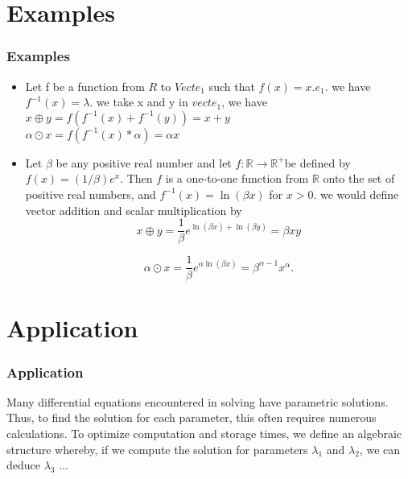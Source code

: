 \documentclass[11pt]{beamer}
\begin{document}

\section{Examples}
\begin{frame}
    \frametitle{Examples}
    \begin{itemize}
        \item Let f be a function from $R$ to $Vect{e_1}$ such that $f(x) = x.e_1$.
        we have $f^{-1}(x) = \lambda$.
            we take x and y in $vect{e_1}$, we have \\
            $x\oplus y = f(f^{-1}(x) + f^{-1}(y)) = x + y$ \\
            $\alpha \odot x = f(f^{-1}(x) * \alpha) = \alpha x$
            \item Let $\beta$ be any positive real number and let $f: \mathbb{R} \rightarrow \mathbb{R}^{+}$be defined by $f(x)=(1 / \beta) e^x$. Then $f$ is a one-to-one function from $\mathbb{R}$ onto the set of positive real numbers, and $f^{-1}(x)=\ln (\beta x)$ for $x>0$. we would define vector addition and scalar multiplication by
            $$
            x \oplus y=\frac{1}{\beta} e^{\ln (\beta x)+\ln (\beta y)}=\beta x y
            $$ 
            
            $$
            \alpha \odot x=\frac{1}{\beta} e^{\alpha \ln (\beta x)}=\beta^{\alpha-1} x^\alpha.
            $$ 
        \end{itemize}
    \end{frame}


    
    \section{Application}
    \begin{frame}
        \frametitle{Application}
        Many differential equations encountered 
        in solving have parametric solutions.
         Thus, to find the solution for each 
         parameter, this often requires 
         numerous calculations. To optimize 
         computation and storage times, we 
         define an algebraic structure 
         whereby, if we compute the solution 
         for parameters $\lambda_1$ and $ \lambda_2 $,
         we can deduce $\lambda_3$ ...
         
        \end{frame}
    
    
    
    
    
\end{document}

